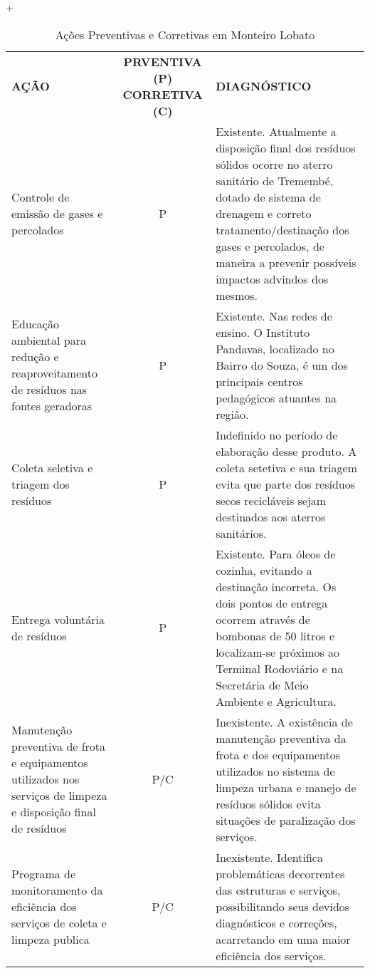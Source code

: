 +%
\begin{table}[htbp]
	\centering
	\caption{Ações Preventivas e Corretivas em Monteiro Lobato}
	\begin{tabular}{p{23.455em}cp{27.725em}}
		\rowcolor[rgb]{ .969,  .588,  .275} \textcolor[rgb]{ 1,  1,  1}{\textbf{AÇÃO}} & \multicolumn{1}{p{7.91em}}{\textcolor[rgb]{ 1,  1,  1}{\textbf{PRVENTIVA (P) CORRETIVA (C)}}} & \textcolor[rgb]{ 1,  1,  1}{\textbf{DIAGNÓSTICO}} \\
		\rowcolor[rgb]{ .984,  .831,  .706} Controle de emissão de gases e percolados & P     & Existente. Atualmente a disposição final dos resíduos sólidos ocorre no aterro sanitário de Tremembé, dotado de sistema de drenagem e correto tratamento/destinação dos gases e percolados, de maneira a prevenir possíveis impactos advindos dos mesmos. \\
		\rowcolor[rgb]{ .992,  .914,  .851} Educação ambiental para redução e reaproveitamento de resíduos nas fontes geradoras & P     & Existente. Nas redes de ensino. O Instituto Pandavas, localizado no Bairro do Souza, é um dos principais centros pedagógicos atuantes na região. \\
		\rowcolor[rgb]{ .984,  .831,  .706} Coleta seletiva e triagem dos resíduos & P     & Indefinido no período de elaboração desse produto. A coleta setetiva e sua triagem evita que parte dos resíduos secos recicláveis sejam destinados aos aterros sanitários. \\
		\rowcolor[rgb]{ .992,  .914,  .851} Entrega voluntária de resíduos & P     & Existente. Para óleos de cozinha, evitando a destinação incorreta. Os dois pontos de entrega ocorrem através de bombonas de 50 litros e localizam-se próximos ao Terminal Rodoviário e na Secretária de Meio Ambiente e Agricultura. \\
		\rowcolor[rgb]{ .984,  .831,  .706} Manutenção preventiva de frota e equipamentos utilizados nos serviços de limpeza e disposição final de resíduos & \multicolumn{1}{p{7.91em}}{P/C} & Inexistente. A existência de manutenção preventiva da frota e dos equipamentos utilizados no sistema de limpeza urbana e manejo de resíduos sólidos evita situações de paralização dos serviços. \\
		\rowcolor[rgb]{ .992,  .914,  .851} Programa de monitoramento da eficiência dos serviços de coleta e limpeza publica & P/C   & Inexistente. Identifica problemáticas decorrentes das estruturas e serviços, possibilitando seus devidos diagnósticos e correções, acarretando em uma maior eficiência dos serviços. \\

\end{tabular}
\end{table}
